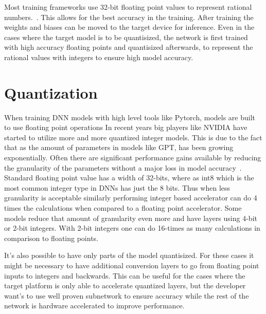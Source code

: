\documentclass[12pt,a4paper,english
]{tunithesis}
\begin{document}
Most training frameworks use 32-bit floating point values to represent rational numbers.~\cite{paszke_pytorch_2019}\cite{tensorflow2015-whitepaper}. This allows for the best accuracy in the training. After training the weights and biases can be moved to the target device for inference. Even in the cases where the target model is to be quantisized, the network is first trained with high accuracy floating points and quantisized afterwards, to represent the rational values with integers to ensure high model accuracy.

\section{Quantization}
When training DNN models with high level tools like Pytorch, models are built to use floating point operations In recent years big players like NVIDIA have started to utilize more and more quantized integer models. This is due to the fact that as the amount of parameters in models like GPT, has been growing exponentially. Often there are significant performance gains available by reducing the granularity of the parameters without a major loss in model accuracy~\cite{krishnamoorthi_quantizing_2018}. Standard floating point value has a width of 32-bits, where as int8 which is the most common integer type in DNNs has just the 8 bits. Thus when less granularity is acceptable similarly performing integer based accelerator can do 4 times the calculations when compared to a floating point accelerator.
Some models reduce that amount of granularity even more and have layers using 4-bit or 2-bit integers. With 2-bit integers one can do 16-times as many calculations in comparison to floating points.

It's also possible to have only parts of the model quantisized. For these cases it might be necessary to have additional conversion layers to go from floating point inputs to integers and backwards. This can be useful for the cases where the target platform is only able to accelerate quantized layers, but the developer want's to use well proven subnetwork to ensure accuracy while the rest of the network is hardware accelerated to improve performance.
\end{document}
